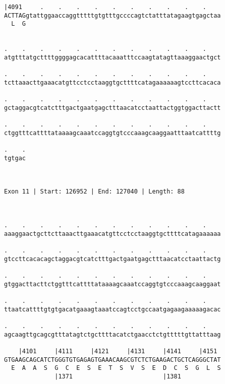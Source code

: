 \documentclass{article}
\begin{document}
\begin{Verbatim}
|4091     .    .    .    .    .    .    .    .    .    .    
ACTTAGgtattggaaccaggtttttgtgtttgccccagtctatttatagaagtgagctaa
  L  G                                                      
                                                            
  
.    .    .    .    .    .    .    .    .    .    .    .    
atgtttatgcttttggggagcacattttacaaatttccaagtatagttaaaggaactgct
                                                            
.    .    .    .    .    .    .    .    .    .    .    .    
tcttaaacttgaaacatgttcctcctaaggtgcttttcatagaaaaaagtccttcacaca
                                                            
.    .    .    .    .    .    .    .    .    .    .    .    
gctaggacgtcatctttgactgaatgagctttaacatcctaattactggtggacttactt
                                                            
.    .    .    .    .    .    .    .    .    .    .    .    
ctggtttcattttataaaagcaaatccaggtgtcccaaagcaaggaatttaatcattttg
                                                            
.    .
tgtgac
      
      
 
Exon 11 | Start: 126952 | End: 127040 | Length: 88



.    .    .    .    .    .    .    .    .    .    .    .    
aaaggaactgcttcttaaacttgaaacatgttcctcctaaggtgcttttcatagaaaaaa
                                                            
.    .    .    .    .    .    .    .    .    .    .    .    
gtccttcacacagctaggacgtcatctttgactgaatgagctttaacatcctaattactg
                                                            
.    .    .    .    .    .    .    .    .    .    .    .    
gtggacttacttctggtttcattttataaaagcaaatccaggtgtcccaaagcaaggaat
                                                            
.    .    .    .    .    .    .    .    .    .    .    .    
ttaatcattttgtgtgacatgaaagtaaatccagtcctgccaatgagaagaaaaagacac
                                                            
.    .    .    .    .    .    .    .    .    .    .    .    
agcaagttgcagcgtttatagtctgcttttacatctgaacctctgtttttgttatttaag
                                                            
    |4101     |4111     |4121     |4131     |4141     |4151 
GTGAAGCAGCATCTGGGTGTGAGAGTGAAACAAGCGTCTCTGAAGACTGCTCAGGGCTAT
  E  A  A  S  G  C  E  S  E  T  S  V  S  E  D  C  S  G  L  S
              |1371                         |1381           
  

\end{Verbatim}
\end{document}

